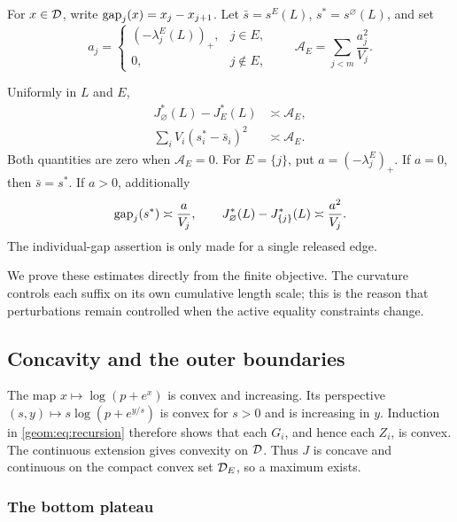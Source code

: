 For \(x\in\mathcal D\), write \(\operatorname{gap}_j(x)=x_j-x_{j+1}\).
Let \(\bar s=s^E(L)\), \(s^*=s^\varnothing(L)\), and set
\begin{equation}
 a_j=
 \begin{cases}(-\lambda_j^E(L))_+,&j\in E,\\0,&j\notin E,\end{cases}
 \qquad \mathcal A_E=\sum_{j<m}\frac{a_j^2}{V_j}.       \label{geom:eq:AE}
\end{equation}

\begin{theorem}\label{geom:thm:opening}
Uniformly in \(L\) and \(E\),
\begin{align}
 J_\varnothing^*(L)-J_E^*(L)&\asymp\mathcal A_E,       \label{geom:eq:openingrate}\\
 \sum_i V_i(s_i^*-\bar s_i)^2&\asymp\mathcal A_E.     \label{geom:eq:openingdisp}
\end{align}
Both quantities are zero when \(\mathcal A_E=0\).
For \(E=\{j\}\), put \(a=(-\lambda_j^E)_+\).  If \(a=0\),
then \(\bar s=s^*\).  If \(a>0\), additionally
\begin{equation}
 \operatorname{gap}_j(s^*)\asymp \frac a{V_j},\qquad
 J_\varnothing^*(L)-J_{\{j\}}^*(L)\asymp\frac{a^2}{V_j}.
                                                        \label{geom:eq:single}
\end{equation}
The individual-gap assertion is only made for a single released edge.
\end{theorem}

We prove these estimates directly from the finite objective. The curvature
controls each suffix on its own cumulative length scale; this is the
reason that perturbations remain controlled when the active equality
constraints change.

\subsection{Concavity and the outer boundaries}

The map \(x\mapsto\log(p+e^x)\) is convex and increasing.  Its
perspective \((s,y)\mapsto s\log(p+e^{y/s})\) is convex for \(s>0\)
and is increasing in \(y\).  Induction in \eqref{geom:eq:recursion} therefore
shows that each \(G_i\), and hence each \(Z_i\), is convex.  The continuous
extension gives convexity on \(\mathcal D\).  Thus \(J\) is concave and
continuous on the compact convex set \(\mathcal D_E\), so a maximum exists.

\subsubsection{The bottom plateau}

